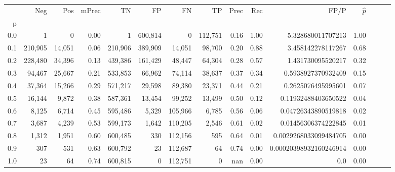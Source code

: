 \begin{tabular}{rrrrrrrrrrrrrrr}
\toprule
{} &      Neg &     Pos & mPrec &       TN &       FP &       FN &       TP &  Prec &   Rec &                    FP/P & $\hat{p}$ \\
p   &          &         &       &          &          &          &          &       &       &                         &           \\
\midrule
0.0 &        1 &       0 &  0.00 &        1 &  600,814 &        0 &  112,751 &  0.16 &  1.00 &       5.328680011707213 &      1.00 \\
0.1 &  210,905 &  14,051 &  0.06 &  210,906 &  389,909 &   14,051 &   98,700 &  0.20 &  0.88 &       3.458142278117267 &      0.68 \\
0.2 &  228,480 &  34,396 &  0.13 &  439,386 &  161,429 &   48,447 &   64,304 &  0.28 &  0.57 &       1.431730095520217 &      0.32 \\
0.3 &   94,467 &  25,667 &  0.21 &  533,853 &   66,962 &   74,114 &   38,637 &  0.37 &  0.34 &      0.5938927370932409 &      0.15 \\
0.4 &   37,364 &  15,266 &  0.29 &  571,217 &   29,598 &   89,380 &   23,371 &  0.44 &  0.21 &      0.2625076495995601 &      0.07 \\
0.5 &   16,144 &   9,872 &  0.38 &  587,361 &   13,454 &   99,252 &   13,499 &  0.50 &  0.12 &     0.11932488403650522 &      0.04 \\
0.6 &    8,125 &   6,714 &  0.45 &  595,486 &    5,329 &  105,966 &    6,785 &  0.56 &  0.06 &     0.04726343890519818 &      0.02 \\
0.7 &    3,687 &   4,239 &  0.53 &  599,173 &    1,642 &  110,205 &    2,546 &  0.61 &  0.02 &     0.01456306374222845 &      0.01 \\
0.8 &    1,312 &   1,951 &  0.60 &  600,485 &      330 &  112,156 &      595 &  0.64 &  0.01 &   0.0029268033099484705 &      0.00 \\
0.9 &      307 &     531 &  0.63 &  600,792 &       23 &  112,687 &       64 &  0.74 &  0.00 &  0.00020398932160246914 &      0.00 \\
1.0 &       23 &      64 &  0.74 &  600,815 &        0 &  112,751 &        0 &   nan &  0.00 &                     0.0 &      0.00 \\
\bottomrule
\end{tabular}
